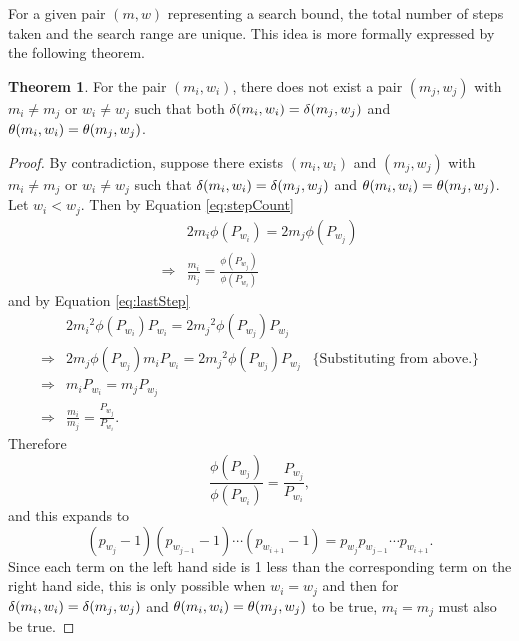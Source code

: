\documentclass{ucalgthes1}
\theoremstyle{definition}
\newtheorem{thm}{Theorem}[section]
\begin{document}
For a given pair $(m, w)$ representing a search bound, the total number of steps taken and the search range are unique.  This idea is more formally expressed by the following theorem.
\begin{thm}
For the pair $(m_i, w_i)$, there does not exist a pair $(m_j, w_j)$ with $m_i \neq m_j$ or $w_i \neq w_j$ such that both $\delta(m_i, w_i) = \delta(m_j, w_j)$ and $\theta(m_i, w_i) = \theta(m_j, w_j)$.
\end{thm}
\begin{proof}
By contradiction, suppose there exists $(m_i, w_i)$ and $(m_j, w_j)$ with $m_i \neq m_j$ or $w_i \neq w_j$ such that $\delta(m_i, w_i) = \delta(m_j, w_j)$ and $\theta(m_i, w_i) = \theta(m_j, w_j)$.  Let $w_i < w_j$. Then by Equation \ref{eq:stepCount}
\begin{align*}
	& 2m_i\phi(P_{w_i}) = 2m_j\phi(P_{w_j}) \\
	\Rightarrow & \frac{m_i}{m_j} = \frac{\phi(P_{w_j})}{\phi(P_{w_i})}
\end{align*}
and by Equation \ref{eq:lastStep}
\begin{align*}
	& 2{m_i}^2\phi(P_{w_i})P_{w_i} = 2{m_j}^2\phi(P_{w_j})P_{w_j} \\
\Rightarrow & 2m_j\phi(P_{w_j})m_i P_{w_i} = 2{m_j}^2\phi(P_{w_j})P_{w_j} & \textrm{\{Substituting from above.\}} \\
\Rightarrow & m_iP_{w_i} = m_jP_{w_j} \\
\Rightarrow & \frac{m_i}{m_j} = \frac{P_{w_j}}{P_{w_i}}.
\end{align*}
Therefore
\[
	\frac{\phi(P_{w_j})}{\phi(P_{w_i})} = \frac{P_{w_j}}{P_{w_i}},
\]
and this expands to
\[
	(p_{w_j} - 1)(p_{w_{j-1}} - 1) \cdots (p_{w_{i+1}} - 1) = p_{w_j} p_{w_{j-1}} \cdots p_{w_{i+1}}.
\]
Since each term on the left hand side is 1 less than the corresponding term on the right hand side, this is only possible when $w_i = w_j$ and then for $\delta(m_i, w_i) = \delta(m_j, w_j)$ and $\theta(m_i, w_i) = \theta(m_j, w_j)$ to be true, $m_i = m_j$ must also be true.
\end{proof}
\end{document}
